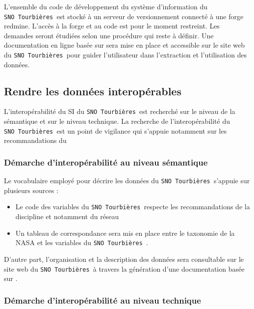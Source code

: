 \documentclass[]{article}
\newcommand{\mhref}[3][blue]{\href{#2}{\color{#1}{#3}}}%
\newcommand{\SNOT}{{\tt SNO~Tourbières }}
\begin{document}
L'ensemble du code de développement du système d'information du \SNOT est stocké à un serveur de versionnement  connecté à une forge redmine. L'accès à la forge et au code est pour le moment restreint. Les demandes seront étudiées selon une procédure qui reste à définir.
Une documentation en ligne basée sur \mhref{http://www.mkdocs.org/}{mkdocs} sera mise en place et accessible sur le site web du \SNOT pour guider l'utilisateur dans l'extraction et l'utilisation des données.

\subsection{Rendre les données interopérables}

L'interopérabilité du SI du \SNOT est recherché sur le niveau de la sémantique et sur le niveau technique. La recherche de l'interopérabilité du \SNOT est un point de vigilance qui s'appuie notamment sur les recommandations du \mhref{http://references.modernisation.gouv.fr/sites/default/files/Referentiel_General_Interoperabilite_V2.pdf}{Référentiel Général d'Interopérabilité (RGI)}

\subsubsection{Démarche d'interopérabilité au niveau sémantique}

Le vocabulaire employé pour décrire les données du \SNOT s'appuie sur plusieurs sources :
\begin{itemize}
	\item Le code des variables du \SNOT respecte les recommandations de la discipline et notamment du réseau \mhref{http://www.icos-etc.eu/icos/}{ICOS}
	\item Un tableau de correspondance sera mis en place entre le taxonomie \mhref{https://gcmd.nasa.gov/}{Global Change Master Directory} de la NASA et les variables du \SNOT.
\end{itemize}

D'autre part, l'organisation et la description des données sera consultable sur le site web du \SNOT à travers la génération d'une documentation basée sur \mhref{http://schemaspy.org/}{schemaspy}.

\subsubsection{Démarche d'interopérabilité au niveau technique}
\end{document}
